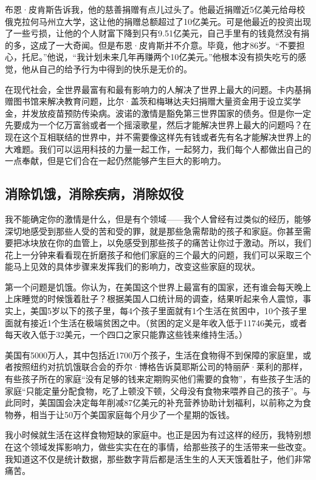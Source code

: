 布恩·皮肯斯告诉我，他的慈善捐赠有点儿过头了。他最近捐赠近5亿美元给母校俄克拉何马州立大学，这让他的捐赠总额超过了10亿美元。可是他最近的投资出现了一些亏损，让他的个人财富下降到只有9.51亿美元，自己手里有的钱竟然没有捐的多，这成了一大奇闻。但是布恩·皮肯斯并不介意。毕竟，他才86岁。“不要担心，托尼。”他说，“我计划未来几年再赚两个10亿美元。”他根本没有损失吃亏的感觉，他从自己的给予行为中得到的快乐是无价的。

在现代社会，全世界最富有和最有影响力的人解决了世界上最大的问题。卡内基捐赠图书馆来解决教育问题，比尔·盖茨和梅琳达夫妇捐赠大量资金用于设立奖学金，并发放疫苗预防传染病。波诺的激情是豁免第三世界国家的债务。但是你一定先要成为一个亿万富翁或者一个摇滚歌星，然后才能解决世界上最大的问题吗？在现在这个互相联结的世界中，并不需要像这样先有钱或者先有名才能解决世界上的大难题。我们可以运用科技的力量一起工作，一起努力，我们每个人都做出自己的一点奉献，但是它们合在一起仍然能够产生巨大的影响力。

\subsection{消除饥饿，消除疾病，消除奴役}

我不能确定你的激情是什么，但是有个领域——我个人曾经有过类似的经历，能够深切地感受到那些人受的苦和受的罪，就是那些急需帮助的孩子和家庭。你甚至需要把冰块放在你的血管上，以免感受到那些孩子的痛苦让你过于激动。所以，我们花上一分钟来看看现在折磨孩子和他们家庭的三个最大的问题，我们可以采取三个能马上见效的具体步骤来发挥我们的影响力，改变这些家庭的现状。

第一个问题是饥饿。你认为，在美国这个世界上最富有的国家，还有谁会每天晚上上床睡觉的时候饿着肚子？根据美国人口统计局的调查，结果听起来令人震惊，事实上，美国5岁以下的孩子里，每4个孩子里面就有1个生活在贫困中，10个孩子里面就有接近1个生活在极端贫困之中。（贫困的定义是年收入低于11746美元，或者每天收入低于32美元，一个四口之家只能靠这些钱来维持生活。）

美国有5000万人，其中包括近1700万个孩子，生活在食物得不到保障的家庭里，或者按照纽约对抗饥饿联合会的乔尔·博格告诉莫耶斯公司的特丽萨·莱利的那样，有些孩子所在的家庭“没有足够的钱来定期购买他们需要的食物”，有些孩子生活的家庭“只能定量分配食物，吃了上顿没下顿，父母没有食物来喂养自己的孩子”。与此同时，美国国会决定每年削减87亿美元的补充营养协助计划福利，以前称之为食物券，相当于让50万个美国家庭每个月少了一个星期的饭钱。

我小时候就生活在这样食物短缺的家庭中。也正是因为有过这样的经历，我特别想在这个领域发挥影响力，做些实实在在的事情，给那些孩子的生活带来一些改变。我知道这不仅是统计数据，那些数字背后都是活生生的人天天饿着肚子，他们非常痛苦。

